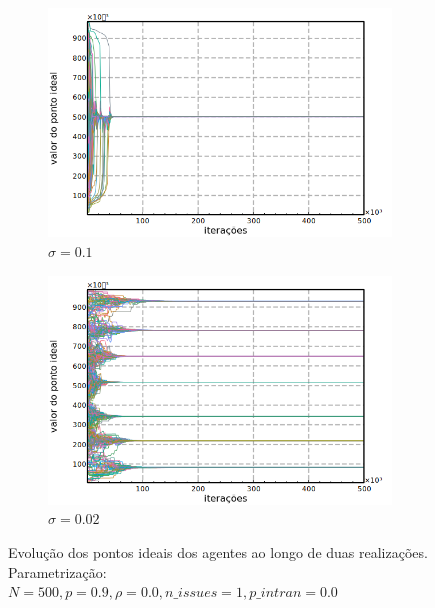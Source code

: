 \begin{figure}[h]
    \centering
    \begin{subfigure}[b]{0.49\textwidth}
      \includegraphics[width=\textwidth]{ims/timeseries1.png}
      \caption{\( \sigma = 0.1\) }
    \end{subfigure}
    \begin{subfigure}[b]{0.49\textwidth}
      \includegraphics[width=\textwidth]{ims/timeseries2.png}
       \caption{\(\sigma = 0.02\) }
      \end{subfigure}
      \caption{Evolução dos pontos ideais dos agentes ao longo de duas realizações.
        Parametrização: \(  N = 500, p = 0.9, \rho = 0.0, n\_issues = 1 , p\_intra
        n= 0.0 \)}
      \label{fig:tseries1}
    \end{figure}
    

